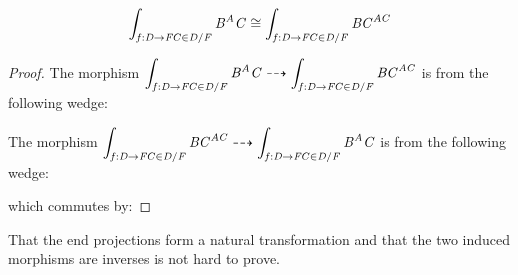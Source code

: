 \begin{lemma}\label{adx:coslice-end-exponent-proof}
    \[ \End{\vf : \vD \to \vF\vC \in \commaC\vD\vF} \Exp\vB\vA\vC \iso \End{\vf : \vD \to \vF\vC \in \commaC\vD\vF} \Exp{\vB\vC}{\vA\vC} \]
\end{lemma}
\begin{proof}

The morphism  $\End{\vf : \vD \to \vF\vC \in \commaC\vD\vF} \Exp\vB\vA\vC \dashrightarrow \End{\vf : \vD \to \vF\vC \in \commaC\vD\vF} \Exp{\vB\vC}{\vA\vC}$ is from the following wedge:
\begin{center}
\end{center}

The morphism  $\End{\vf : \vD \to \vF\vC \in \commaC\vD\vF} \Exp{\vB\vC}{\vA\vC} \dashrightarrow \End{\vf : \vD \to \vF\vC \in \commaC\vD\vF} \Exp\vB\vA\vC$ is from the following wedge:
\begin{center}
\end{center}
    which commutes by:
\end{proof}
\noindent
That the end projections form a natural transformation and that the two induced morphisms are inverses is not hard to prove.
